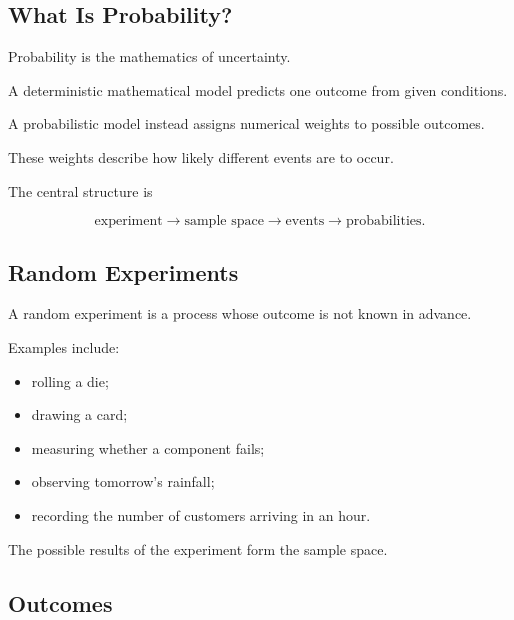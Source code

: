 \subsection{What Is Probability?}
\label{subsec:what-is-probability}

Probability is the mathematics of uncertainty.

A deterministic mathematical model predicts one outcome from given
conditions.

A probabilistic model instead assigns numerical weights to possible
outcomes.

These weights describe how likely different events are to occur.

The central structure is

\[
\boxed{
\text{experiment}
\longrightarrow
\text{sample space}
\longrightarrow
\text{events}
\longrightarrow
\text{probabilities}.
}
\]

\subsection{Random Experiments}
\label{subsec:random-experiments}

A random experiment is a process whose outcome is not known in advance.

Examples include:

\begin{itemize}
    \item rolling a die;
    \item drawing a card;
    \item measuring whether a component fails;
    \item observing tomorrow's rainfall;
    \item recording the number of customers arriving in an hour.
\end{itemize}

The possible results of the experiment form the sample space.

\subsection{Outcomes}
\label{subsec:probability-outcomes}


